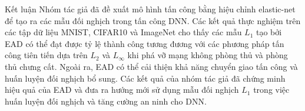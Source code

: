 \begin{frame}{Kết luận}
    Nhóm tác giả đã đề xuất mô hình tấn công bằng hiệu chỉnh elastic-net để tạo ra các mẫu đối nghịch trong tấn công DNN. Các kết quả thực nghiệm trên các tập dữ liệu MNIST, CIFAR10 và ImageNet cho thấy các mẫu $L_1$ tạo bởi EAD có thể đạt được tỷ lệ thành công tương đương với các phương pháp tấn công tiên tiến dựa trên $L_2$ và $L_{\infty}$ khi phá vỡ mạng không phòng thủ và phòng thủ chưng cất. Ngoài ra, EAD có thể cải thiện khả năng chuyển giao tấn công và huấn luyện đối nghịch bổ sung. Các kết quả của nhóm tác giả đã chứng minh hiệu quả của EAD và đưa ra hướng mới sử dụng mẫu đối nghịch $L_1$ trong việc huấn luyện đối nghịch và tăng cường an ninh cho DNN.
\end{frame}